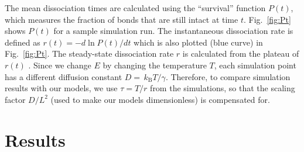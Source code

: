 \documentclass[twocolumn,pre,aps,showpacs,a4paper,floatfix,amssymb]{revtex4-1}
\newcommand{\kBT}{\,k_\mathrm{B}T}
\newcommand{\refeq}[1]{Eq.~(\ref{#1})}
\newcommand{\refig}[1]{Fig.~\ref{#1}}
\newcommand{\MAi}[1]{#1} %
\begin{document}
The mean dissociation times are calculated using the ``survival'' function $P(t)$, which measures the fraction of bonds that are still intact at time $t$. \refig{fig:Pt} shows $P(t)$ for a sample simulation run.
The instantaneous dissociation rate is defined as 
$r(t) = -{d\ln P(t)}/{dt}$ \cite{boilley1993nuclear} 
which is also plotted (blue curve) in \refig{fig:Pt}. 
The steady-state dissociation rate $r$ is calculated from the plateau of $r(t)$ \cite{footnotePoisson}.
\MAi{Since we change $E$ by changing the temperature $T$, 
each simulation point has a different diffusion constant $D=\kBT/\gamma$.
Therefore, to compare simulation results with our models, %
we use $\tau=T/r$ from the simulations,
so that the scaling factor $D/L^2$ (used to make our models dimensionless) is compensated for.}


\section{Results}
%

\end{document}
